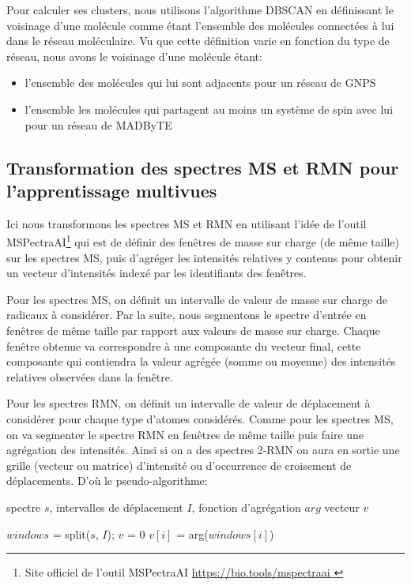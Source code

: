		 Pour calculer ses clusters, nous utilisons l'algorithme \acrshort{DBSCAN} en définissant le voisinage d'une molécule comme étant l'ensemble des molécules connectées à lui dans le réseau moléculaire.
		 Vu que cette définition varie en fonction du type de réseau, nous avons le voisinage d'une molécule étant:
		 \begin{itemize}
 			  \item l'ensemble des molécules qui lui sont adjacents pour un réseau de GNPS
 			  \item l'ensemble les molécules qui partagent au moins un système de spin avec lui pour un réseau de MADByTE
   	 \end{itemize}
    
   	 \subsection{Transformation des spectres MS et RMN pour l'apprentissage multivues}

   	 Ici nous transformons les spectres MS et RMN en utilisant l'idée de l'outil MSPectraAI\footnote{Site officiel de l'outil MSPectraAI \href{ https://bio.tools/mspectraai }{ https://bio.tools/mspectraai } } qui est de définir des fenêtres de masse sur charge (de même taille) sur les spectres MS, puis d'agréger les intensités relatives y contenus pour obtenir un vecteur d'intensités indexé par les identifiants des fenêtres.

   	 Pour les spectres \acrshort{MS}, on définit un intervalle de valeur de masse sur charge de radicaux à considérer.
   	 Par la suite, nous segmentons le spectre d’entrée en fenêtres de même taille par rapport aux valeurs de masse sur charge.
   	 Chaque fenêtre obtenue va correspondre à une composante du vecteur final, cette composante qui contiendra la valeur agrégée (somme ou moyenne) des intensités relatives observées dans la fenêtre.

   	 Pour les spectres \acrshort{RMN}, on définit un intervalle de valeur de déplacement à considérer pour chaque type d'atomes considérés.
   	 Comme pour les spectres MS, on va segmenter le spectre RMN en fenêtres de même taille puis faire une agrégation des intensités.
   	 Ainsi si on a des spectres 2-RMN on aura en sortie une grille (vecteur ou matrice) d'intensité ou d'occurrence de croisement de déplacements. D’où le pseudo-algorithme:

    	\begin{algorithm}[H]
     		   \caption{Algorithme de prétraitement de spectres}
     		   \label{alg:molndbscan}
     		   \begin{algorithmic}[1]
     		   \REQUIRE spectre $s$, intervalles de déplacement $I$, fonction d'agrégation $arg$
            	\ENSURE vecteur $v$
		 
     		   \STATE $windows$ = split($s$, $I$);
            	\STATE $v$ = 0
                	$v[i]$ = arg($windows[i]$)
            	\ENDFOR
           	 
     		  \end{algorithmic}
     	  \end{algorithm}


